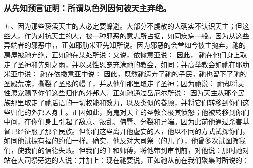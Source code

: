 
\subsubsection{从先知预言证明：所谓以色列因何被天主弃绝。}

五、因为那些亵渎天主的人必定要躲避。大部分不虔敬的人确实不认识天主；但这些人，作为对抗天主的人，被一种邪恶的意志所占据，如同疾病一般。因为从这些异端者的邪恶中，，正如耶肋米亚先知所说。因为邪恶的会堂如今被主抛弃，祂的房屋被祂弃绝，正如祂在某处所说：又说，依撒意亚说： 因此， 祂在他们身上取走了圣神和先知之雨，并以灵性恩宠充满祂的教会，如同；并高举教会如祂在耶肋米亚中说： 祂在依撒意亚中说： 因此，既然祂遗弃了祂的子民，祂也留下了祂的圣殿荒凉，撕裂了圣殿的幔子，并从他们那里取走了圣神；因为祂说： 祂却将灵性恩宠赐予你们这些归化的外邦人，正如祂通过岳厄尔所说： 因为天主从那个民族那里取走了祂话语的一切权能和效力，以及类似的眷顾，并将它们转移到你们这些归化的外邦人身上。正因如此，魔鬼对天主的圣教会极其愤怒；他被转移到你们中间，在你们身上引起了敌意、叛乱、侮辱、分裂和异端。因为此前他通过杀害基督已经征服了那个民族。但你们这些离开他虚妄的人，他以不同的方式试探你们，如同他试探有福的约伯一样。确实，他反对大司祭（的儿子），他曾多次试图筛我们，使我们的信德失败。但我们的主和师傅，将他带到审判前，对他说：那时祂对站在大司祭旁边的人说：并加上：现在祂要说，正如祂从前在我们聚集时所说的：\par


